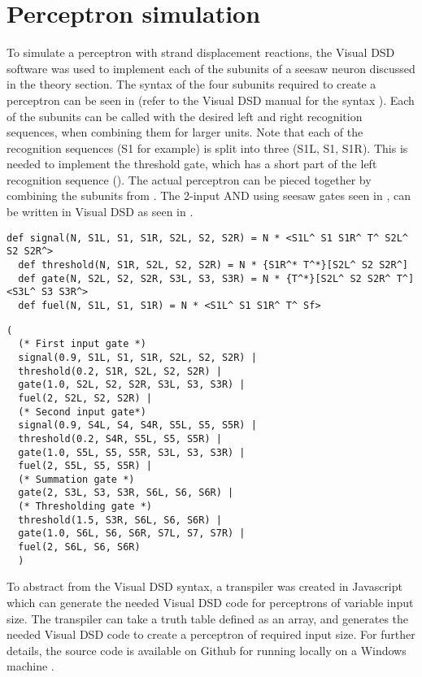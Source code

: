 \section{Perceptron simulation}

To simulate a perceptron with strand displacement reactions, the Visual DSD software was used to implement each of the subunits of a seesaw neuron discussed in the theory section. The syntax of the four subunits required to create a perceptron can be seen in  (refer to the Visual DSD manual for the syntax \cite{dsdmanual}). Each of the subunits can be called with the desired left and right recognition sequences, when combining them for larger units. Note that each of the recognition sequences (S1 for example) is split into three (S1L, S1, S1R). This is needed to implement the threshold gate, which has a short part of the left recognition sequence (). The actual perceptron can be pieced together by combining the subunits from . The 2-input AND using seesaw gates seen in , can be written in Visual DSD as seen in .

\begin{lstlisting}[float, label=dsd_subunits, caption=Visual DSD definition of the seesaw gate subunits.]
  def signal(N, S1L, S1, S1R, S2L, S2, S2R) = N * <S1L^ S1 S1R^ T^ S2L^ S2 S2R^>
  def threshold(N, S1R, S2L, S2, S2R) = N * {S1R^* T^*}[S2L^ S2 S2R^]
  def gate(N, S2L, S2, S2R, S3L, S3, S3R) = N * {T^*}[S2L^ S2 S2R^ T^]<S3L^ S3 S3R^>
  def fuel(N, S1L, S1, S1R) = N * <S1L^ S1 S1R^ T^ Sf>
\end{lstlisting}

\begin{lstlisting}[float, label=dsd_and_gate, caption=Code for a seesaw neuron in Visual DSD]
  (
  (* First input gate *)
  signal(0.9, S1L, S1, S1R, S2L, S2, S2R) |
  threshold(0.2, S1R, S2L, S2, S2R) |
  gate(1.0, S2L, S2, S2R, S3L, S3, S3R) |
  fuel(2, S2L, S2, S2R) |
  (* Second input gate*)
  signal(0.9, S4L, S4, S4R, S5L, S5, S5R) |
  threshold(0.2, S4R, S5L, S5, S5R) |
  gate(1.0, S5L, S5, S5R, S3L, S3, S3R) |
  fuel(2, S5L, S5, S5R) |
  (* Summation gate *)
  gate(2, S3L, S3, S3R, S6L, S6, S6R) |
  (* Thresholding gate *)
  threshold(1.5, S3R, S6L, S6, S6R) |
  gate(1.0, S6L, S6, S6R, S7L, S7, S7R) |
  fuel(2, S6L, S6, S6R)
  )
\end{lstlisting}

To abstract from the Visual DSD syntax, a transpiler was created in Javascript which can generate the needed Visual DSD code for perceptrons of variable input size. The transpiler can take a truth table defined as an array, and generates the needed Visual DSD code to create a perceptron of required input size. For further details, the source code is available on Github for running locally on a Windows machine \cite{neuralcompiler}.

